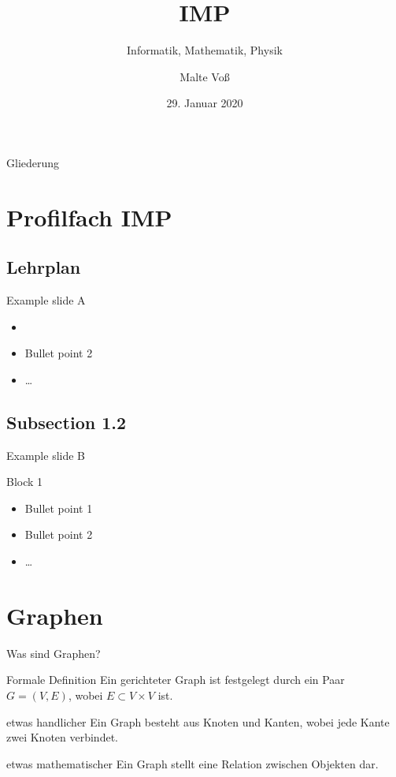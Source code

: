 \documentclass[18pt]{beamer}
\title[IMP]{IMP}
\subtitle{Informatik, Mathematik, Physik}
\author{Malte Vo\ss}
\institute{Abteilung für Didaktik der Mathematik}
\date{29. Januar 2020}
\begin{document}

\begin{frame}
\titlepage
\end{frame}

\begin{frame}{Gliederung}
\tableofcontents
\end{frame}

\section{Profilfach IMP}
    \subsection{Lehrplan}
    \begin{frame}{Example slide A}
    \begin{itemize}
    \item
    \pause
    \item Bullet point 2
    \item \dots
    \end{itemize}
    \end{frame}

    \subsection{Subsection 1.2}
    \begin{frame}{Example slide B}
    \begin{block}{Block 1}
    \begin{itemize}
    \item Bullet point 1
    \pause
    \item Bullet point 2
    \item \dots
    \end{itemize}
    \end{block}
    \end{frame}

\section{Graphen}
    \begin{frame}{Was sind Graphen?}
        \begin{block}{Formale Definition}
            \glqq Ein gerichteter Graph ist festgelegt durch ein Paar $G = (V, E)$, wobei $E \subset V \times V$ ist\grqq \cite{worsch2016}.
        \end{block}
        \pause
        \begin{block}{etwas handlicher}
            Ein Graph besteht aus Knoten und Kanten, wobei jede Kante zwei Knoten verbindet.
        \end{block}
        \pause
        \begin{block}{etwas mathematischer}
            Ein Graph stellt eine Relation zwischen Objekten dar.
        \end{block}
    \end{frame}
\end{document}
